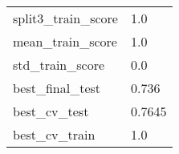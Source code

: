 \begin{tabular}{ll}
split3\_train\_score            &                                                1.0 \\
mean\_train\_score              &                                                1.0 \\
std\_train\_score               &                                                0.0 \\
best\_final\_test               &                                              0.736 \\
best\_cv\_test                  &                                             0.7645 \\
best\_cv\_train                 &                                                1.0 \\
\bottomrule
\end{tabular}
